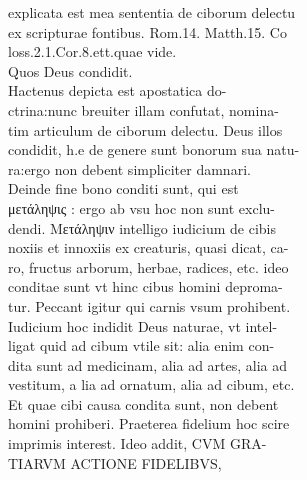 \documentclass{article}
\begin{document}
\begin{pages}
                explicata est mea sententia de ciborum delectu \\
                ex scripturae fontibus. Rom.14. Matth.15. Co \\
                loss.2.1.Cor.8.ett.quae vide. \\
                Quos Deus condidit. \\
                Hactenus depicta est apostatica do- \\
                ctrina:nunc breuiter illam confutat, nomina- \\
                tim articulum de ciborum delectu. Deus illos \\
                condidit, h.e de genere sunt bonorum sua natu- \\
                ra:ergo non debent simpliciter damnari. \\
                Deinde fine bono conditi sunt, qui est \\
                μετάληψις : ergo ab vsu hoc non sunt exclu- \\
                dendi. Μετάληψιν intelligo iudicium de cibis \\
                noxiis et innoxiis ex creaturis, quasi dicat, ca- \\
                ro, fructus arborum, herbae, radices, etc. ideo \\
                conditae sunt vt hinc cibus homini deproma- \\
                tur. Peccant igitur qui carnis vsum prohibent. \\
                Iudicium hoc indidit Deus naturae, vt intel- \\
                ligat quid ad cibum vtile sit: alia enim con- \\
                dita sunt ad medicinam, alia ad artes, alia ad \\
                vestitum, a lia ad ornatum, alia ad cibum, etc. \\
                Et quae cibi causa condita sunt, non debent \\
                homini prohiberi. Praeterea fidelium hoc scire \\
                imprimis interest. Ideo addit, CVM GRA- \\
                TIARVM ACTIONE FIDELIBVS, \\

\end{pages}
\end{document}
